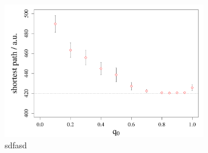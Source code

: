 
\begin{figure}[H]

	\centering
	\includegraphics[width=0.8\textwidth]{Plots/q0_vs_shortestpath.pdf}

\caption{sdfasd}
\label{fig:q0zushortestpath}
\end{figure}